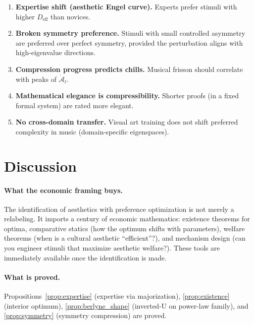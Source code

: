 \documentclass[journal]{IEEEtran}
\theoremstyle{definition}
\theoremstyle{remark}
\begin{document}
\begin{enumerate}
    \item \textbf{Expertise shift (aesthetic Engel curve).}
    Experts prefer stimuli with higher $D_{\mathrm{eff}}$ than
    novices.

    \item \textbf{Broken symmetry preference.}  Stimuli with small
    controlled asymmetry are preferred over perfect symmetry,
    provided the perturbation aligns with high-eigenvalue directions.

    \item \textbf{Compression progress predicts chills.}
    Musical frisson should correlate with peaks of
    $\dot{\mathcal{A}}_t$.

    \item \textbf{Mathematical elegance is compressibility.}
    Shorter proofs (in a fixed formal system) are rated more
    elegant.

    \item \textbf{No cross-domain transfer.}  Visual art training
    does not shift preferred complexity in music (domain-specific
    eigenspaces).
\end{enumerate}


\section{Discussion}
\label{sec:discussion}

\paragraph{What the economic framing buys.}
The identification of aesthetics with preference optimization is not
merely a relabeling.  It imports a century of economic mathematics:
existence theorems for optima, comparative statics (how the optimum
shifts with parameters), welfare theorems (when is a cultural
aesthetic ``efficient''?), and mechanism design (can you engineer
stimuli that maximize aesthetic welfare?).  These tools are
immediately available once the identification is made.

\paragraph{What is proved.}
Propositions~\ref{prop:expertise} (expertise via majorization),
\ref{prop:existence} (interior optimum), \ref{prop:berlyne_shape}
(inverted-U on power-law family), and \ref{prop:symmetry}
(symmetry compression) are proved.
\end{document}
